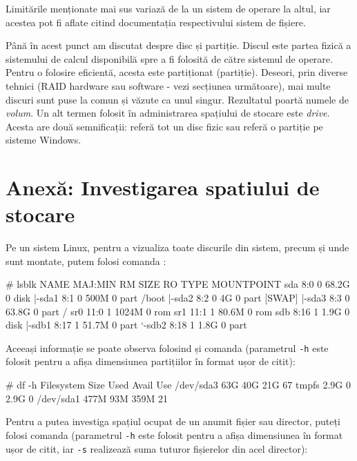 Limitările menționate mai sus variază de la un sistem de operare la altul, iar
acestea pot fi aflate citind documentația respectivului sistem de fișiere.

Până în acest punct am discutat despre disc și partiție. Discul este partea
fizică a sistemului de calcul disponibilă spre a fi folosită de către sistemul
de operare. Pentru o folosire eficientă, acesta este partiționat (partiție).
Deseori, prin diverse tehnici (RAID hardware sau software - vezi secțiunea
următoare), mai multe discuri sunt puse la comun și văzute ca unul singur.
Rezultatul poartă numele de \textit{volum}. Un alt termen folosit în
administrarea spațiului de stocare este \textit{drive}. Acesta are două
semnificații: referă tot un disc fizic sau referă o partiție pe sisteme Windows.

\section{Anexă: Investigarea spatiului de stocare}
\label{sec:storage-investigare}

Pe un sistem Linux, pentru a vizualiza toate discurile din sistem, precum și
unde sunt montate, putem folosi comanda :

\begin{screen}
# lsblk
NAME   MAJ:MIN RM  SIZE RO TYPE MOUNTPOINT
sda      8:0    0 68.2G  0 disk
|-sda1   8:1    0  500M  0 part /boot
|-sda2   8:2    0    4G  0 part [SWAP]
|-sda3   8:3    0 63.8G  0 part /
sr0     11:0    1 1024M  0 rom
sr1     11:1    1 80.6M  0 rom
sdb      8:16   1  1.9G  0 disk
|-sdb1   8:17   1 51.7M  0 part
`-sdb2   8:18   1  1.8G  0 part
\end{screen}

Aceeași informație se poate observa folosind și comanda  (parametrul
\texttt{-h} este folosit pentru a afișa dimensiunea partițiilor în format ușor
de citit):

\begin{screen}
# df -h
Filesystem      Size  Used Avail Use%
/dev/sda3        63G   40G   21G  67%
tmpfs           2.9G     0  2.9G   0%
/dev/sda1       477M   93M  359M  21%
\end{screen}

Pentru a putea investiga spațiul ocupat de un anumit fișier sau director, puteți
folosi comanda  (parametrul \texttt{-h} este folosit pentru a afișa
dimensiunea în format ușor de citit, iar \texttt{-s} realizează suma tuturor
fișierelor din acel director):

